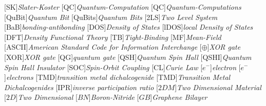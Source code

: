 \begin{acronym}[TDMA]
  [SK]{\emph{Slater-Koster}}
  [QC]{\emph{Quantum-Computation}}
  [QC]{\emph{Quantum-Computations}}
  [QuBit]{\emph{Quantum Bit}}
  [QuBits]{\emph{Quantum Bits}}
  [2LS]{\emph{Two Level System}}
  [BaB]{\emph{bonding-antibonding}}
  [DOS]{\emph{Density of States}}
  [lDOS]{\emph{local Density of States}}
  [DFT]{\emph{Density Functional Theory}}
  [TB]{\emph{Tight-Binding}}
  [MF]{\emph{Mean-Field}}
  [ASCII]{\emph{American Standard Code for Information Interchange}}
  [$\oplus$]{\emph{XOR gate}}
  [XOR]{\emph{XOR gate}}
  [QG]{\emph{quantum gate}}
  [QSH]{\emph{Quantum Spin Hall}}
  [QSHI]{\emph{Quantum Spin Hall Insulator}}
  [SOC]{\emph{Spin-Orbit Coupling}}
  [CL]{\emph{Curie Law}}
  [$e^{-}$]{\emph{electron}}
  [$e^{-}$]{\emph{electrons}}
  [TMD]{\emph{transition metal dichalcogenide}}
  [TMD]{\emph{Transition Metal Dichalcogenides}}
  [IPR]{\emph{inverse participation ratio}}
  [$2DM$]{\emph{Two Dimensional Material}}
  [$2D$]{\emph{Two Dimensional}}
  [$BN$]{\emph{Boron-Nitride}}
  [$GB$]{\emph{Graphene Bilayer}}
\end{acronym}
